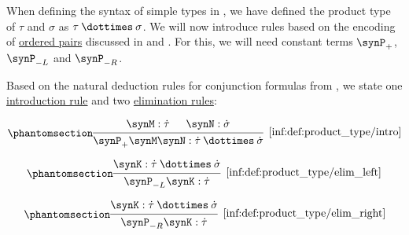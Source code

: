 \begin{definition}\label{def:product_type}\mimprovised
  When defining the syntax of simple types in , we have defined the product type of \( \tau \) and \( \sigma \) as \( \tau \syntimes \sigma \). We will now introduce rules based on the encoding of \hyperref[def:ordered_tuple]{ordered pairs} discussed in  and . For this, we will need constant terms \( \synP_+ \), \( \synP_{-L} \) and \( \synP_{-R} \).

  Based on the natural deduction rules for conjunction formulas from , we state one \hyperref[rem:type_theory_rule_classification/introduction]{introduction rule} and two \hyperref[rem:type_theory_rule_classification/elimination]{elimination rules}:
  \begin{paracol}{3}
    \begin{nthcolumn}{0}
      \ParacolAlignmentHack
      \begin{equation*}\taglabel[\ensuremath{ \times_+ }]{inf:def:product_type/intro}
        \begin{prooftree}
          \hypo{ \synM: \syn\tau }
          \hypo{ \synN: \syn\sigma }
          \infer2[\ref{inf:def:product_type/intro}]{ \synP_+ \synM \synN: \syn\tau \syntimes \syn\sigma }
        \end{prooftree}
      \end{equation*}
    \end{nthcolumn}

    \begin{nthcolumn}{1}
      \ParacolAlignmentHack
      \begin{equation*}\taglabel[\ensuremath{ \times_{-L} }]{inf:def:product_type/elim_left}
        \begin{prooftree}
          \hypo{ \synK: \syn\tau \syntimes \syn\sigma }
          \infer1[\ref{inf:def:product_type/elim_left}]{ \synP_{-L} \synK: \syn\tau }
        \end{prooftree}
      \end{equation*}
    \end{nthcolumn}

    \begin{nthcolumn}{2}
      \ParacolAlignmentHack
      \begin{equation*}\taglabel[\ensuremath{ \times_{-R} }]{inf:def:product_type/elim_right}
        \begin{prooftree}
          \hypo{ \synK: \syn\tau \syntimes \syn\sigma }
          \infer1[\ref{inf:def:product_type/elim_right}]{ \synP_{-R} \synK: \syn\tau }
        \end{prooftree}
      \end{equation*}
    \end{nthcolumn}
  \end{paracol}
\end{definition}
